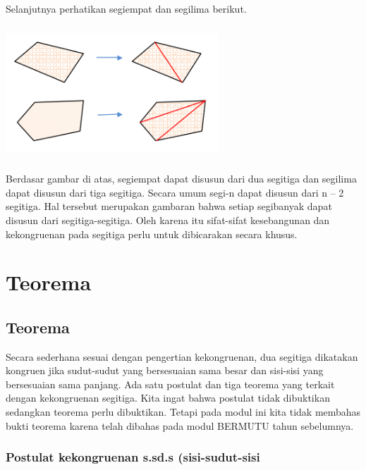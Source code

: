 \documentclass[11pt,fleqn]{book} %
\begin{document}
Selanjutnya perhatikan segiempat dan segilima berikut. 

\includegraphics[width = 8cm, height= 5cm]{Pictures/3.png}

Berdasar gambar di atas, segiempat dapat disusun dari dua segitiga dan segilima
dapat disusun dari tiga segitiga. Secara umum segi-n dapat disusun dari n – 2 segitiga.
Hal tersebut merupakan gambaran bahwa setiap segibanyak dapat disusun dari segitiga-segitiga. Oleh karena itu sifat-sifat kesebangunan dan kekongruenan pada
segitiga perlu untuk dibicarakan secara khusus. 





\chapter{Teorema}

\section{Teorema}

Secara sederhana sesuai dengan pengertian kekongruenan, dua segitiga dikatakan
kongruen jika sudut-sudut yang bersesuaian sama besar dan sisi-sisi yang bersesuaian
sama panjang. Ada satu postulat dan tiga teorema yang terkait dengan kekongruenan
segitiga. Kita ingat bahwa postulat tidak dibuktikan sedangkan teorema perlu
dibuktikan. Tetapi pada modul ini kita tidak membahas bukti teorema karena telah
dibahas pada modul BERMUTU tahun sebelumnya. 

\subsection{Postulat kekongruenan s.sd.s (sisi-sudut-sisi}
\end{document}
